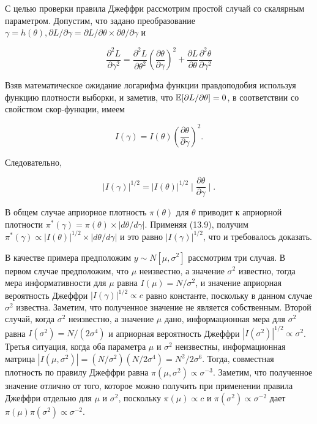 С целью проверки правила Джеффри рассмотрим простой случай со скалярным параметром. Допустим, что задано преобразование $\gamma=h(\theta), \partial{L}/\partial\gamma=\partial{L}/\partial\theta{\times}\partial\theta/\partial\gamma$ и

\[
\dfrac{\partial^{2}L}{\partial\gamma^{2}}=\dfrac{\partial^{2}L}{\partial\theta^{2}}\left( \dfrac{\partial\theta}{\partial\gamma}\right)^{2}+\dfrac{\partial{L}}{\partial\theta}\dfrac{\partial^{2}\theta}{\partial\gamma^{2}}
\]

Взяв математическое ожидание логарифма функции правдоподобия используя функцию плотности выборки, и заметив, что $\mathbb{E}[\partial{L}/\partial\theta]=0$, в соответствии со свойством скор-функции, имеем

\[
I(\gamma)=I(\theta)\left(\dfrac{\partial\theta}{\partial\gamma}\right)^{2}.
\]

Следовательно,

\[
|I(\gamma)|^{1/2}=|I(\theta)|^{1/2}\mid\dfrac{\partial\theta}{\partial\gamma}\mid.
\]

В общем случае априорное плотность $\pi(\theta)$ для $\theta$ приводит к априорной плотности $\pi^{*}(\gamma)=\pi(\theta){\times}|d\theta/d\gamma|$. Применяя (13.9), получим $\pi^{*}(\gamma)\propto|I(\theta)|^{1/2}{\times}|d\theta/d\gamma|$ и это  равно $|I(\gamma)|^{1/2}$, что и требовалось доказать.

В качестве примера предположим $y{\sim}N[\mu,\sigma^{2}]$  рассмотрим три случая. В первом случае предположим, что $\mu$ неизвестно, а значение $\sigma^{2}$ известно, тогда мера информативности для $\mu$ равна $I(\mu)=N/\sigma^{2}$, и значение априорная вероятность Джеффри $|I(\gamma)|^{1/2}{\propto}c$ равно константе, поскольку в данном случае $\sigma^{2}$ известна. Заметим, что полученное значение не является собственным. Второй случай, когда $\sigma^{2}$ неизвестно, а значение $\mu$ дано, информационная мера для $\sigma^{2}$ равна $I(\sigma^{2})=N/(2\sigma^{4})$ и априорная вероятность Джеффри $|I(\sigma^{2})|^{1/2}\propto\sigma^{2}$. Третья ситуация, когда оба параметра $\mu$ и $\sigma^{2}$ неизвестны, информационная матрица $|I{(\mu,\sigma^{2})}|=(N/\sigma^{2})(N/2\sigma^{4})=N^{2}/2\sigma^{6}$. Тогда, совместная плотность по правилу Джеффри равна $\pi(\mu,\sigma^{2})\propto\sigma^{-3}$. Заметим, что полученное значение отлично от того, которое можно  получить при применении правила Джеффри  отдельно для $\mu$ и $\sigma^{2}$, поскольку $\pi(\mu)\propto{c}$ и $\pi(\sigma^{2})\propto\sigma^{-2}$ дает $\pi(\mu)\pi(\sigma^{2})\propto\sigma^{-2}$. 

